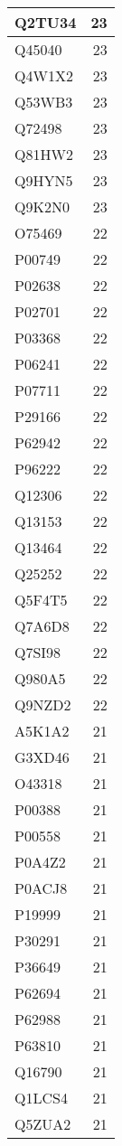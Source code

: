 \documentclass[
]{book}
\theoremstyle{definition}
\theoremstyle{definition}
\theoremstyle{definition}
\theoremstyle{definition}
\theoremstyle{remark}
\begin{document}
\begin{table}
\begin{tabular}{l|r}
\hline
Q2TU34 & 23\\
\hline
Q45040 & 23\\
\hline
Q4W1X2 & 23\\
\hline
Q53WB3 & 23\\
\hline
Q72498 & 23\\
\hline
Q81HW2 & 23\\
\hline
Q9HYN5 & 23\\
\hline
Q9K2N0 & 23\\
\hline
O75469 & 22\\
\hline
P00749 & 22\\
\hline
P02638 & 22\\
\hline
P02701 & 22\\
\hline
P03368 & 22\\
\hline
P06241 & 22\\
\hline
P07711 & 22\\
\hline
P29166 & 22\\
\hline
P62942 & 22\\
\hline
P96222 & 22\\
\hline
Q12306 & 22\\
\hline
Q13153 & 22\\
\hline
Q13464 & 22\\
\hline
Q25252 & 22\\
\hline
Q5F4T5 & 22\\
\hline
Q7A6D8 & 22\\
\hline
Q7SI98 & 22\\
\hline
Q980A5 & 22\\
\hline
Q9NZD2 & 22\\
\hline
A5K1A2 & 21\\
\hline
G3XD46 & 21\\
\hline
O43318 & 21\\
\hline
P00388 & 21\\
\hline
P00558 & 21\\
\hline
P0A4Z2 & 21\\
\hline
P0ACJ8 & 21\\
\hline
P19999 & 21\\
\hline
P30291 & 21\\
\hline
P36649 & 21\\
\hline
P62694 & 21\\
\hline
P62988 & 21\\
\hline
P63810 & 21\\
\hline
Q16790 & 21\\
\hline
Q1LCS4 & 21\\
\hline
Q5ZUA2 & 21\\

\end{tabular}
\end{table}
\end{document}
